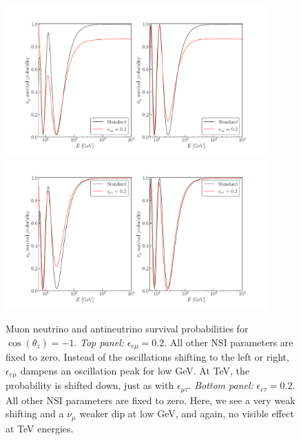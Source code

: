 \documentclass{revtex4-2}
\newcommand{\z}{\ensuremath{\cos{(\theta_z)}}}
\newcommand{\emt}{\ensuremath{\epsilon_{\mu\tau}}}
\newcommand{\eet}{\epsilon_{e\tau}}
\newcommand{\eem}{\epsilon_{e\mu}}
\newcommand{\nm}{\nu_\mu}
\begin{document}
\begin{figure} %
    \begin{center}
        \includegraphics[width=0.9\textwidth]{figures/eem_probs.pdf}
        \includegraphics[width=0.9\textwidth]{figures/eet_probs.pdf}
        \caption{Muon neutrino and antineutrino survival probabilities for
        $\z = -1$. \emph{Top panel:} $\eem = 0.2$. All other NSI parameters are fixed to zero. Instead of the oscillations shifting to the left or right, $\eem$ dampens an oscillation peak for low \si{\GeV}. At \si{\TeV}, the probability is shifted down, just as with $\emt$.
        \emph{Bottom panel:} $\eet = 0.2$. All other NSI parameters are fixed to zero. Here, we see a very weak shifting and a $\nm$ weaker dip at low \si{\GeV}, and again, no visible effect at \si{TeV} energies. }
        \label{fig:eem_eet_probs}
    \end{center}
\end{figure}


\end{document}
